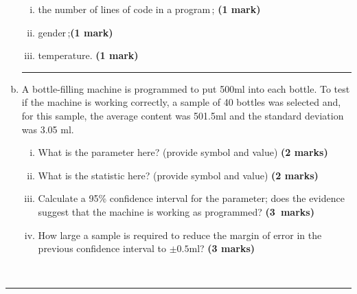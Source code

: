 \documentclass[12pt]{article}
\begin{document}
\begin{enumerate}[a)]
\begin{enumerate}[i)]
    \item the number of lines of code in a program\,; \hfill{\scriptsize \bf (1 mark)}
    \item gender\,;\hfill{\scriptsize \bf (1 mark)}
    \item temperature. \hfill{\scriptsize \bf (1 mark)}
    \end{enumerate}
    \begin{center}\noindent\rule{0.4\linewidth}{0.5pt}\end{center}
\item A bottle-filling machine is programmed to put 500ml into each bottle. To test if the machine is working correctly, a sample of 40 bottles was selected and, for this sample, the average content was 501.5ml and the standard deviation was 3.05 ml.
    \begin{enumerate}[i)]\itemsep0.3cm
    \item What is the parameter here? (provide symbol and value) \hfill{\scriptsize \bf (2 marks)}
    \item What is the statistic here? (provide symbol and value) \hfill{\scriptsize \bf (2 marks)}
    \item Calculate a 95\% confidence interval for the parameter; does the evidence suggest that the machine is working as programmed? \hfill{\mbox{\scriptsize \bf (3 marks)}}
    \item How large a sample is required to reduce the margin of error in the previous confidence interval to $\pm0.5$ml? \hfill{\scriptsize \bf (3 marks)}
    \end{enumerate}
\end{enumerate}
\quad\\[-0.3cm]
\noindent\rule{\linewidth}{1pt}

\newpage
\end{document}
